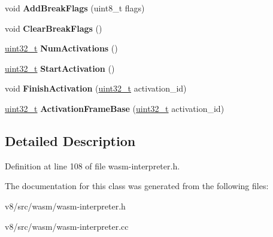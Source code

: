\begin{DoxyCompactItemize}
void {\bfseries Add\+Break\+Flags} (uint8\+\_\+t flags)
\item 
\mbox{\label{classv8_1_1internal_1_1wasm_1_1WasmInterpreter_1_1Thread_aab182ec6ca0d1f813dff370a32f719ac}} 
void {\bfseries Clear\+Break\+Flags} ()
\item 
\mbox{\label{classv8_1_1internal_1_1wasm_1_1WasmInterpreter_1_1Thread_a308e8f8e8b86f5a2ba2d35ffa3b459ce}} 
\mbox{\hyperlink{classuint32__t}{uint32\+\_\+t}} {\bfseries Num\+Activations} ()
\item 
\mbox{\label{classv8_1_1internal_1_1wasm_1_1WasmInterpreter_1_1Thread_a5991020905aea1753532861c7c8b322b}} 
\mbox{\hyperlink{classuint32__t}{uint32\+\_\+t}} {\bfseries Start\+Activation} ()
\item 
\mbox{\label{classv8_1_1internal_1_1wasm_1_1WasmInterpreter_1_1Thread_ab3753e2e36ee297845cfaa5e8b5f4bbd}} 
void {\bfseries Finish\+Activation} (\mbox{\hyperlink{classuint32__t}{uint32\+\_\+t}} activation\+\_\+id)
\item 
\mbox{\label{classv8_1_1internal_1_1wasm_1_1WasmInterpreter_1_1Thread_a69c9b5a94fe323cecf523cf4a286ff9a}} 
\mbox{\hyperlink{classuint32__t}{uint32\+\_\+t}} {\bfseries Activation\+Frame\+Base} (\mbox{\hyperlink{classuint32__t}{uint32\+\_\+t}} activation\+\_\+id)
\end{DoxyCompactItemize}


\subsection{Detailed Description}


Definition at line 108 of file wasm-\/interpreter.\+h.



The documentation for this class was generated from the following files\+:\begin{DoxyCompactItemize}
\item 
v8/src/wasm/wasm-\/interpreter.\+h\item 
v8/src/wasm/wasm-\/interpreter.\+cc\end{DoxyCompactItemize}
